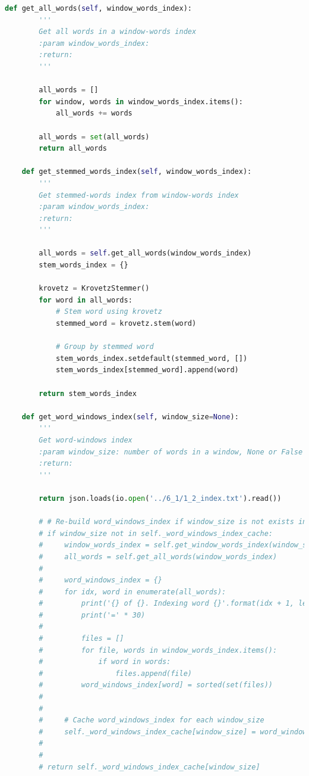 \documentclass[letterpaper,11pt]{article}
\begin{document}
\begin{lstlisting}[language=python, caption={Association Measure}, label={lst:assoc_measure}]
    def get_all_words(self, window_words_index):
        '''
        Get all words in a window-words index
        :param window_words_index:
        :return:
        '''

        all_words = []
        for window, words in window_words_index.items():
            all_words += words

        all_words = set(all_words)
        return all_words

    def get_stemmed_words_index(self, window_words_index):
        '''
        Get stemmed-words index from window-words index
        :param window_words_index:
        :return:
        '''

        all_words = self.get_all_words(window_words_index)
        stem_words_index = {}

        krovetz = KrovetzStemmer()
        for word in all_words:
            # Stem word using krovetz
            stemmed_word = krovetz.stem(word)

            # Group by stemmed word
            stem_words_index.setdefault(stemmed_word, [])
            stem_words_index[stemmed_word].append(word)

        return stem_words_index

    def get_word_windows_index(self, window_size=None):
        '''
        Get word-windows index
        :param window_size: number of words in a window, None or False if use document
        :return:
        '''

        return json.loads(io.open('../6_1/1_2_index.txt').read())

        # # Re-build word_windows_index if window_size is not exists in _word_windows_index_cache
        # if window_size not in self._word_windows_index_cache:
        #     window_words_index = self.get_window_words_index(window_size)
        #     all_words = self.get_all_words(window_words_index)
        #
        #     word_windows_index = {}
        #     for idx, word in enumerate(all_words):
        #         print('{} of {}. Indexing word {}'.format(idx + 1, len(all_words), word.encode('utf-8')))
        #         print('=' * 30)
        #
        #         files = []
        #         for file, words in window_words_index.items():
        #             if word in words:
        #                 files.append(file)
        #         word_windows_index[word] = sorted(set(files))
        #
        #
        #     # Cache word_windows_index for each window_size
        #     self._word_windows_index_cache[window_size] = word_windows_index
        #
        #
        # return self._word_windows_index_cache[window_size]


\end{lstlisting}
\end{document}
